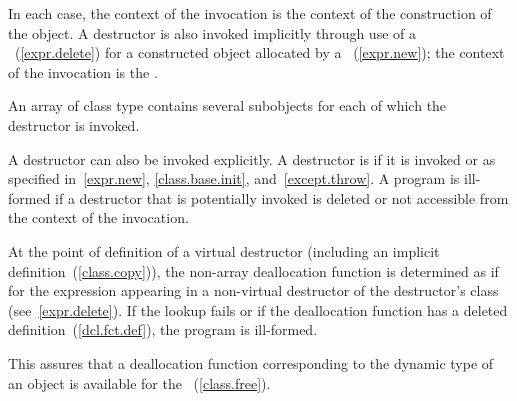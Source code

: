 %
%
In each case, the context of the invocation is the context of the construction of
the object. A destructor is also invoked implicitly through use of a
~(\ref{expr.delete}) for a constructed object allocated
by a ~(\ref{expr.new}); the context of the invocation is the
.
\begin{note} An array of class type contains several subobjects for each of which
the destructor is invoked. \end{note}
A destructor can also be invoked explicitly. A destructor is 
if it is invoked or as specified in~\ref{expr.new}, \ref{class.base.init},
and~\ref{except.throw}.
A program is ill-formed if a destructor that is potentially invoked is deleted
or not accessible from the context of the invocation.

\pnum
At the point of definition of a virtual destructor (including an implicit
definition~(\ref{class.copy})), the non-array deallocation function is 
determined as if for the expression  appearing in a
non-virtual destructor of the destructor's class (see~\ref{expr.delete}).
If the lookup fails or if the deallocation function has
a deleted definition~(\ref{dcl.fct.def}), the program is ill-formed.
\begin{note}
This assures that a deallocation function corresponding to the dynamic type of an
object is available for the
~(\ref{class.free}).
\end{note}

